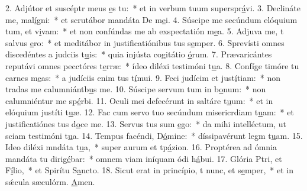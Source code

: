 2. Adjútor et suscéptr meus \uline{e}s tu:~* et in verbum tuum superspr\uline{á}vi.
3. Declináte  me, mal\uline{í}gni:~* et scrutábor mandáta De m\uline{e}i.
4. Súscipe me secúndum elóquium tum, et v\uline{i}vam:~* et non confúndas me ab exspectatión m\uline{e}a.
5. Adjuva me, t salvus \uline{e}ro:~* et meditábor in justificatiónibus tus s\uline{e}mper.
6. Sprevísti omnes discedéntes a judciis t\uline{u}is:~* quia injústa cogitátio \uline{ó}rum.
7. Prævaricántes reputávi omnes pecctóres t\uline{e}rræ:~* ídeo diléxi testimóni t\uline{u}a.
8. Confíge timóre tu carnes m\uline{e}as:~* a judíciis enim tus t\uline{í}mui.
9. Feci judícim et just\uline{í}tiam:~* non tradas me calumniántb\uline{u}s me.
10. Súscipe servum tum in b\uline{o}num:~* non calumniéntur me sp\uline{é}rbi.
11. Oculi mei defecérunt in saltáre t\uline{u}um:~* et in elóquium justíti t\uline{u}æ.
12. Fac cum servo tuo secúndum misericrdiam t\uline{u}am:~* et justificatiónes tus d\uline{o}ce me.
13. Servus tus sum \uline{e}go:~* da mihi intelléctum, ut sciam testimóni t\uline{u}a.
14. Tempus facéndi, D\uline{ó}mine:~* díssipavérunt legm t\uline{u}am.
15. Ideo diléxi mndáta t\uline{u}a,~* super aurum et tp\uline{á}zion.
16. Proptérea ad ómnia mandáta tu dirig\uline{é}bar:~* omnem viam iníquam ódi h\uline{á}bui.
17. Glória Ptri, et F\uline{í}lio,~* et Spirítu S\uline{a}ncto.
18. Sicut erat in princípio, t nunc, et s\uline{e}mper,~* et in sǽcula sæculórm. \uline{A}men.
